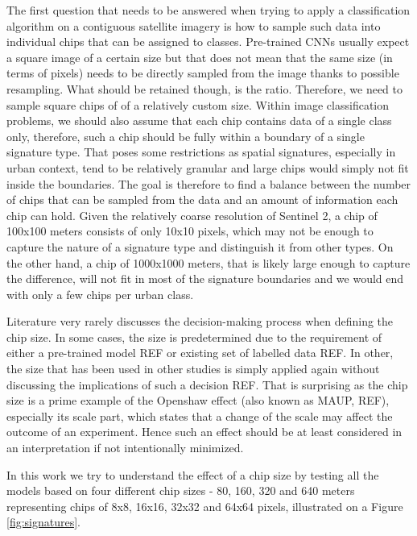 The first question that needs to be answered when trying to apply a classification
algorithm on a contiguous satellite imagery is how to sample such data into individual
chips that can be assigned to classes. Pre-trained CNNs usually expect a square image of
a certain size but that does not mean that the same size (in terms of pixels) needs to
be directly sampled from the image thanks to possible resampling. What should be
retained though, is the ratio. Therefore, we need to sample square chips of of a
relatively custom size. Within image classification problems, we should also assume that
each chip contains data of a single class only, therefore, such a chip should be fully
within a boundary of a single signature type. That poses some restrictions as spatial
signatures, especially in urban context, tend to be relatively granular and large chips
would simply not fit inside the boundaries. The goal is therefore to find a balance
between the number of chips that can be sampled from the data and an amount of
information each chip can hold. Given the relatively coarse resolution of Sentinel 2, a
chip of 100x100 meters consists of only 10x10 pixels, which may not be enough to capture
the nature of a signature type and distinguish it from other types. On the other hand, a
chip of 1000x1000 meters, that is likely large enough to capture the difference, will
not fit in most of the signature boundaries and we would end with only a few chips per
urban class.

Literature very rarely discusses the decision-making process when defining the chip
size. In some cases, the size is predetermined due to the requirement of either a
pre-trained model REF or existing set of labelled data REF. In other, the size that has
been used in other studies is simply applied again without discussing the implications
of such a decision REF. That is surprising as the chip size is a prime example of the
Openshaw effect (also known as MAUP, REF), especially its scale part, which states that
a change of the scale may affect the outcome of an experiment. Hence such an effect
should be at least considered in an interpretation if not intentionally minimized.

In this work we try to understand the effect of a chip size by testing all the models
based on four different chip sizes - 80, 160, 320 and 640 meters representing chips of
8x8, 16x16, 32x32 and 64x64 pixels, illustrated on a Figure \ref{fig:signatures}.


